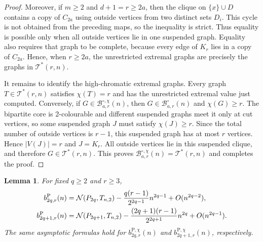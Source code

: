\documentclass[11pt]{article}
\newtheorem{lemma}[theorem]{Lemma}
\theoremstyle{definition}
\theoremstyle{plain}
\theoremstyle{remark}
\theoremstyle{plain}
\numberwithin{equation}{section}
\newcommand{\cB}{\mathcal B}
\newcommand{\cT}{\mathcal T}
\newcommand{\N}{\mathcal N}
\begin{document}
\begin{proof}
Moreover, if $m\ge2$ and $d+1=r\ge2a$, then the clique on $\{x\}\cup D$ contains a copy of $C_{2a}$ using outside vertices from two distinct sets $D_i$. This cycle is not obtained from the preceding maps, so the inequality is strict. Thus equality is possible only when all outside vertices lie in one suspended graph. Equality also requires that graph to be complete, because every edge of $K_r$ lies in a copy of $C_{2a}$. Hence, when $r\ge2a$, the unrestricted extremal graphs are precisely the graphs in $\cT^*(r,n)$.

It remains to identify the high-chromatic extremal graphs. Every graph $T\in\cT^*(r,n)$ satisfies $\chi(T)=r$ and has the unrestricted extremal value just computed. Conversely, if $G\in\cB^{\circ,\chi}_{a,r}(n)$, then $G\in\cB^{\circ}_{a,r}(n)$ and $\chi(G)\ge r$. The bipartite core is 2-colourable and different suspended graphs meet it only at cut vertices, so some suspended graph $J$ must satisfy $\chi(J)\ge r$. Since the total number of outside vertices is $r-1$, this suspended graph has at most $r$ vertices. Hence $|V(J)|=r$ and $J=K_r$. All outside vertices lie in this suspended clique, and therefore $G\in\cT^*(r,n)$. This proves $\cB^{\circ,\chi}_{a,r}(n)=\cT^*(r,n)$ and completes the proof.
\end{proof}

\begin{lemma}\label{lem:path-extremal-asymp}
For fixed $q\ge2$ and $r\ge3$,
\begin{align}
        b^{\mathrm P}_{2q,r}(n)&=\N(P_{2q},T_{n,2})-\frac{q(r-1)}{2^{2q-1}}n^{2q-1}+O(n^{2q-2}),\label{eq:path-even-extremal-asymp}\\
        b^{\mathrm P}_{2q+1,r}(n)&=\N(P_{2q+1},T_{n,2})-\frac{(2q+1)(r-1)}{2^{2q+1}}n^{2q}+O(n^{2q-1}).\notag
\end{align}
The same asymptotic formulas hold for $b^{\mathrm P,\chi}_{2q,r}(n)$ and $b^{\mathrm P,\chi}_{2q+1,r}(n)$, respectively.
\end{lemma}
\end{document}
